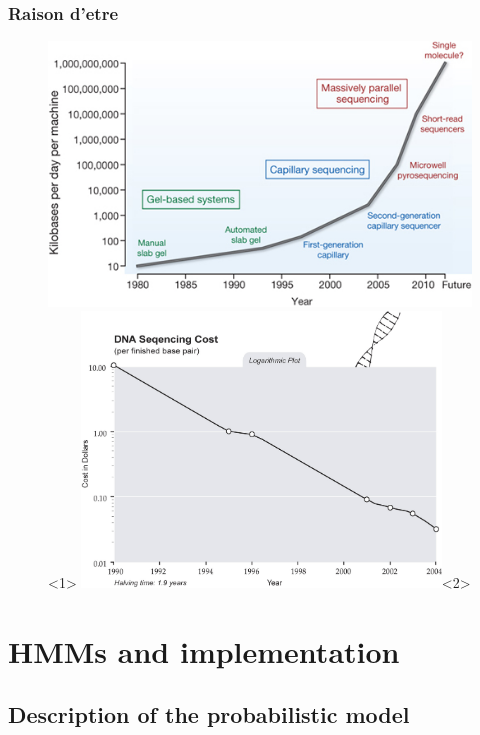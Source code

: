 \documentclass{beamer}
\begin{document}
\begin{frame}
\frametitle{Raison d'etre}
\begin{figure}[h]
			\centering
			\includegraphics[width=1.0\textwidth]{../picturesforthepresentation/wtdv027274.jpg}<1>
			\includegraphics[width=0.85\textwidth]{../picturesforthepresentation/DNAsequencingCost.jpg}<2>		
		\end{figure}
\end{frame}




\section{HMMs and implementation}
\subsection{Description of the probabilistic model}
\end{document}
